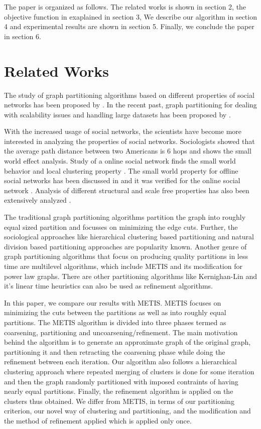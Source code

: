 \documentclass[letterpaper]{article}
\begin{document}
The paper is organized as follows. The related
works is shown in section 2, the objective function in exaplained in section 3, We describe our algorithm  in
 section 4 and  experimental results are shown in section 5.
 Finally, we conclude the paper in section 6.

\section{Related Works}
  The study of graph partitioning algorithms based on different properties of social networks has been proposed by \cite{arxviv}. In the recent past, graph partitioning for dealing with scalability issues and handling large datasets has been proposed by \cite{5,6}.

    With the increased usage of social networks, the scientists have become more interested in analyzing the properties of social networks. 
Sociologists showed that the average path distance between two Americans is 6 hops \cite{4} and \cite{8} shows
the small world effect analysis. 
Study of a online social network  finds the small world behavior and local clustering
 property  \cite{9}.
 The small world property for offline social networks has been discussed in \cite{9,10,11} 
and it was verified for the online social network \cite{12,13}. Analysis of different structural and scale free properties has also been extensively analyzed \cite{12}.



    The traditional graph partitioning algorithms\cite{16,17,18} partition the graph into roughly equal sized partition  and focusses on minimizing the edge cuts.
 Further, the sociological approaches like hierarchical clustering based partitioning and natural division 
based partitioning approaches are popularity known\cite{19}. Another genre of graph partitioning 
algorithms that focus on producing quality partitions in less time are multilevel algorithms, which 
include METIS\cite{20} and its modification for power law graphs\cite{21}. There are other partitioning 
algorithms like Kernighan-Lin\cite{22} and it's linear time heuristics\cite{23} can also be used as 
refinement algorithms.


    In this paper, we  compare our results with METIS\cite{20}. METIS focuses on minimizing the cuts between the partitions as well as into roughly equal partitions. The METIS algorithm is divided into three phases termed as coarsening, partitioning and uncoarsening/refinement.
 The main motivation behind the algorithm is to generate an approximate graph of the original graph, partitioning it and then retracting the coarsening phase while doing the refinement between each iteration.
 Our algorithm also follows a hierarchical clustering approach where repeated merging of clusters is done
 for some iteration and then the graph randomly partitioned with imposed contraints of having nearly equal 
partitions. Finally, the refinement algorithm
 is applied on the clusters thus obtained. We differ from METIS, in terms of our partitioning criterion, 
our novel way of clustering and partitioning, and  the modification and the method of refinement applied 
which is applied only once.
\end{document}
